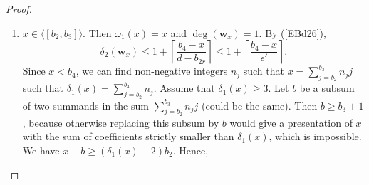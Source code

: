 \documentclass[11pt]{article}
\def\deg{\operatorname{deg}}
\def\wbf{{\mathbf w}}
\theoremstyle{remark}
\theoremstyle{definition}
\begin{document}
\begin{proof}
\begin{enumerate}
\begin{enumerate}[\((\text{b}1)\)]
   If $d+x-b_4$ belongs to $j$-th gap with $i\neq j$, then similar to the subcase \(\text{(a2)}\), we can conclude  that 
  $$\delta_1(\wbf_x) = \delta_1(d+ x)  \leq 2+ \left\lfloor \frac{\lambda_j}{b_2} \right\rfloor.$$
  On the other hand,  using the relation $d-x = (d-b_4) + (b_4-x)$,  as shown in the proof of Corollary \ref{A5}\((i)\), 
   \begin{equation}\label{EBd26}
   \delta_2(\wbf_x)  \leq 1 +  \left\lceil \frac{b_4-x}{d-b_{2r}} \right\rceil \leq  1+ \left\lceil \frac{\lambda_i}{d-b_{2r}} \right\rceil \leq 2+ \left\lfloor \frac{\lambda_i -1}{d-b_{2r}} \right\rfloor.
    \end{equation}
   Hence,  the argument at the end of Case  gives  $D(x) \le M$.
  
  The remaining case is  $b_3< d+x-b_4 < b_4$; that is both $x$ and $d+x-b_4$ belong to the same $i$-th gap. Using the relation $d+x = b_3 + b_4 + (d+x- b_3-b_4)$, similar to the subcase (a1) we get
  $$\delta_1(\wbf_x) = \delta_1(d+ x)  \leq 2+ \left\lfloor \frac{d+x-b_3-b_4}{b_2} \right\rfloor \leq 2+ \left\lfloor \frac{d+x-b_3-b_4}{\epsilon'} \right\rfloor.$$
  On the other hand $d-x = 2(d-b_4) + (b_4 - (d+x-b_4))$. Note that $1, d-b_4 \in A_2$. As shown in the proof of Corollary \ref{A5}\((i)\), 
   $$\delta_2(\wbf_x)  = \delta_2(d-x) \leq 2 + \left\lceil \frac{b_4 - (d+x-b_4)}{d-b_{2r}} \right\rceil \leq 2 +  \left\lceil \frac{2b_4 - (d+x)}{\epsilon'} \right\rceil.$$
   Hence,
   \begin{align*}
       D(x) &\leq \left\lfloor \frac{d+x-b_3-b_4}{\epsilon'} \right\rfloor + 
 \left\lceil \frac{2b_4 - (d+x)}{\epsilon'} \right\rceil \\
&\leq \left\lceil \frac{b_4 - b_3}{\epsilon'} \right\rceil = \left\lfloor \frac{\lambda_i}{\epsilon'} \right\rfloor + 1 \leq M+ 1.
   \end{align*}
         \item $x\in \langle [b_2,b_3]\rangle$. Then $\omega_1(x) =x$ and $\deg(\wbf_x) = 1$. By (\ref{EBd26}),
   $$\delta_2(\wbf_x)  \leq 1+ \left\lceil \frac{b_4 - x}{d-b_{2r}} \right\rceil \leq 1 +  \left\lceil \frac{b_4 - x}{\epsilon'} \right\rceil.$$
   Since $x< b_4$, we can find non-negative integers $n_j$ such that $x =  \sum_{j=b_2}^{b_3} n_jj$ such that $\delta_1(x) =  \sum_{j=b_2}^{b_3} n_j$. Assume that $\delta_1(x) \geq 3$. Let $b$ be a subsum of two summands in the sum $ \sum_{j=b_2}^{b_3} n_jj$ (could be the same). Then $b\geq b_3+1$, because otherwise replacing this subsum by $b$ would give a presentation of $x$ with the sum of coefficients strictly smaller than $\delta_1(x)$, which is impossible. We have $x-b\geq (\delta_1(x) - 2)b_2$. Hence,

\end{enumerate}
\end{enumerate}
\end{proof}
\end{document}
